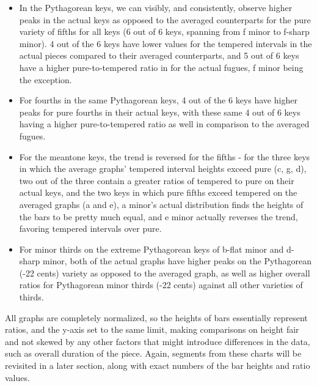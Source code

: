 \begin{itemize}
\tightlist
\item
  In the Pythagorean keys, we can visibly, and consistently, observe
  higher peaks in the actual keys as opposed to the averaged
  counterparts for the pure variety of fifths for all keys (6 out of 6
  keys, spanning from f minor to f-sharp minor). 4 out of the 6 keys
  have lower values for the tempered intervals in the actual pieces
  compared to their averaged counterparts, and 5 out of 6 keys have a
  higher pure-to-tempered ratio in for the actual fugues, f minor being
  the exception.
\item
  For fourths in the same Pythagorean keys, 4 out of the 6 keys have
  higher peaks for pure fourths in their actual keys, with these same 4
  out of 6 keys having a higher pure-to-tempered ratio as well in
  comparison to the averaged fugues.
\item
  For the meantone keys, the trend is reversed for the fifths - for the
  three keys in which the average graphs' tempered interval heights
  exceed pure (c, g, d), two out of the three contain a greater ratios
  of tempered to pure on their actual keys, and the two keys in which
  pure fifths exceed tempered on the averaged graphs (a and e), a
  minor's actual distribution finds the heights of the bars to be pretty
  much equal, and e minor actually reverses the trend, favoring tempered
  intervals over pure.
\item
  For minor thirds on the extreme Pythagorean keys of b-flat minor and
  d-sharp minor, both of the actual graphs have higher peaks on the
  Pythagorean (-22 cents) variety as opposed to the averaged graph, as
  well as higher overall ratios for Pythagorean minor thirds (-22 cents)
  against all other varieties of thirds.
\end{itemize}

All graphs are completely normalized, so the heights of bars essentially
represent ratios, and the y-axis set to the same limit, making
comparisons on height fair and not skewed by any other factors that
might introduce differences in the data, such as overall duration of the
piece. Again, segments from these charts will be revisited in a later
section, along with exact numbers of the bar heights and ratio values.

